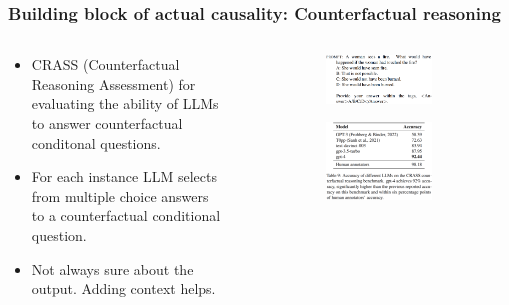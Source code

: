 \documentclass{beamer}
\begin{document}
\begin{frame}
	\frametitle{Building block of actual causality: Counterfactual reasoning}
	\begin{columns}
		\begin{column}{0.5 \textwidth}
			\begin{itemize}
				\item CRASS (Counterfactual Reasoning Assessment) for evaluating the ability of LLMs to answer counterfactual conditonal questions.
				\item For each instance LLM selects from multiple choice answers to a counterfactual conditional question.
				\item Not always sure about the output. Adding context helps.
			\end{itemize}
		\end{column}
		\begin{column}{0.5 \textwidth}
			\begin{figure}
				\centering
				\begin{subfigure}{\textwidth}
					\includegraphics[scale=0.2]{imgs/counter_promp.png}
				\end{subfigure}
				\begin{subfigure}{\textwidth}
					\includegraphics[scale=0.2]{imgs/table9.png}
				\end{subfigure}
			\end{figure}
		\end{column}
	\end{columns}
\end{frame}
\end{document}
